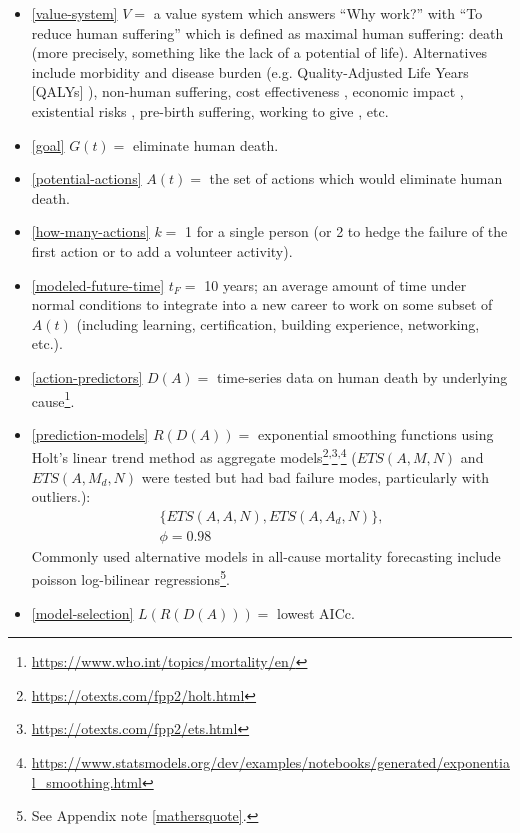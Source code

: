 \documentclass[10pt, a4paper, twocolumn]{IEEEconf}
\begin{document}
\begin{itemize}
  \item \eqref{value-system} $V = $ a value system which answers \enquote{Why work?} with \enquote{To reduce human suffering} which is defined as maximal human suffering: death (more precisely, something like the lack of a potential of life).
  Alternatives include morbidity and disease burden (e.g. Quality-Adjusted Life Years [QALYs] \citep{weinstein2009qalys,lopez2006global}), non-human suffering, cost effectiveness \citep{jamison2017disease,neumann2018comparing,givewellcosteffectiveness}, economic impact \citep{world2009guide}, existential risks \citep{bostrom2013existential}, pre-birth suffering, working to give \citep{macaskill2015doing}, etc.
  \item \eqref{goal} $G(t) = $ eliminate human death.
  \item \eqref{potential-actions} $A(t) = $ the set of actions which would eliminate human death.
  \item \eqref{how-many-actions} $k = $ 1 for a single person (or 2 to hedge the failure of the first action or to add a volunteer activity).
  \item \eqref{modeled-future-time} $t_F = $ 10 years; an average amount of time under normal conditions to integrate into a new career to work on some subset of $A(t)$ (including learning, certification, building experience, networking, etc.).
  \item \eqref{action-predictors} $D(A) = $ time-series data on human death by underlying cause\footnote{\scriptsize{\url{https://www.who.int/topics/mortality/en/}}}.
  \item \eqref{prediction-models} $R(D(A)) = $ exponential smoothing functions using Holt's linear trend method as aggregate models\footnote{\scriptsize{\url{https://otexts.com/fpp2/holt.html}}}\textsuperscript{,}\footnote{\scriptsize{\url{https://otexts.com/fpp2/ets.html}}}\textsuperscript{,}\footnote{\scriptsize{\url{https://www.statsmodels.org/dev/examples/notebooks/generated/exponential_smoothing.html}}} ($ETS(A,M,N)$ and $ETS(A,M_d,N)$ were tested but had bad failure modes, particularly with outliers.):
    \begin{equation*}
      \begin{gathered}
        \{ETS(A,A,N),ETS(A,A_d,N)\},\\
        \phi=0.98
      \end{gathered}
    \end{equation*}
    Commonly used alternative models in all-cause mortality forecasting include poisson log-bilinear regressions\footnote{See Appendix note \ref{mathersquote}.}.
  \item \eqref{model-selection} $L(R(D(A))) = $ lowest AICc.
\end{itemize}
\end{document}
